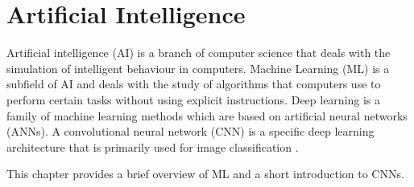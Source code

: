 \section{Artificial Intelligence}
\label{sec:ai}

Artificial intelligence (AI) is a branch of computer science that deals with the simulation of intelligent behaviour in computers.
Machine Learning (ML) is a subfield of AI and deals with the study of algorithms that computers use to perform certain tasks without using explicit instructions.
Deep learning is a family of machine learning methods which are based on artificial neural networks (ANNs).
A convolutional neural network (CNN) is a specific deep learning architecture that is primarily used for image classification \cite{ai_machine_learning}.

This chapter provides a brief overview of ML and a short introduction to CNNs.



